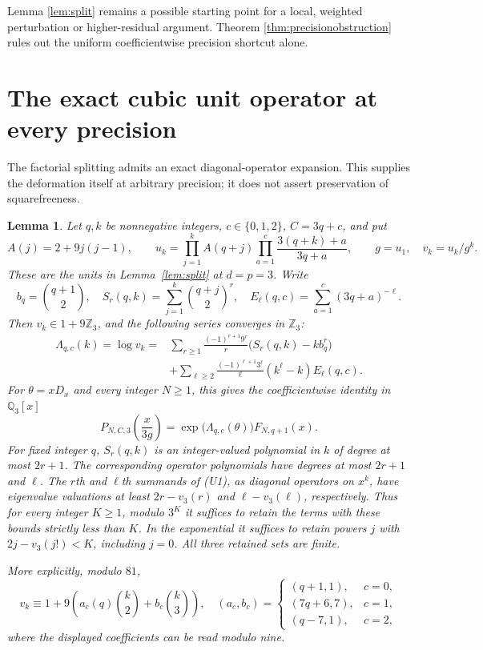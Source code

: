 \documentclass[11pt]{article}
\newtheorem{lemma}[theorem]{Lemma}
\begin{document}
Lemma \ref{lem:split} remains a possible starting point for a local,
weighted perturbation or higher-residual argument.
Theorem \ref{thm:precisionobstruction} rules out the uniform
coefficientwise precision shortcut alone.

\section{The exact cubic unit operator at every precision}
The factorial splitting admits an exact diagonal-operator expansion.
This supplies the deformation itself at arbitrary precision; it does
not assert preservation of squarefreeness.

\begin{lemma}\label{lem:cubic-unit-operator}
Let $q,k$ be nonnegative integers, $c\in\{0,1,2\}$, $C=3q+c$, and put
\[
 A(j)=2+9j(j-1),\qquad
 u_k=\prod_{j=1}^k A(q+j)
       \prod_{a=1}^c\frac{3(q+k)+a}{3q+a},\qquad
 g=u_1,\quad v_k=u_k/g^k .
\]
These are the units in Lemma~\ref{lem:split} at $d=p=3$.
Write
\[
 b_q=\binom{q+1}{2},\quad
 S_r(q,k)=\sum_{j=1}^k\binom{q+j}{2}^r,\quad
 E_\ell(q,c)=\sum_{a=1}^c(3q+a)^{-\ell}.
\]
Then $v_k\in1+9\mathbb Z_3$, and the following series converges in
$\mathbb Z_3$:
\[
\begin{split}
 \Lambda_{q,c}(k)=\log v_k={}&
 \sum_{r\ge1}\frac{(-1)^{r+1}9^r}{r}
           \bigl(S_r(q,k)-kb_q^r\bigr)\\
 &+\sum_{\ell\ge2}\frac{(-1)^{\ell+1}3^\ell}{\ell}
           (k^\ell-k)E_\ell(q,c).
\end{split}                                                   \tag{U1}
\]
For $\theta=xD_x$ and every integer $N\ge1$, this gives the coefficientwise
identity in $\mathbb Q_3[x]$
\[
 P_{N,C,3}\!\left(\frac{x}{3g}\right)
       =\exp\!\bigl(\Lambda_{q,c}(\theta)\bigr)F_{N,q+1}(x).
                                                               \tag{U2}
\]
For fixed integer $q$, $S_r(q,k)$ is an integer-valued polynomial
in $k$ of degree at most $2r+1$. The corresponding operator
polynomials have degrees at most $2r+1$ and $\ell$. The $r$th and $\ell$th summands of
(U1), as diagonal operators on $x^k$, have eigenvalue valuations
at least $2r-v_3(r)$ and $\ell-v_3(\ell)$, respectively.
Thus for every integer $K\ge1$, modulo $3^K$ it suffices to
retain the terms with these bounds
strictly less than $K$. In the exponential it suffices to retain
powers $j$ with $2j-v_3(j!)<K$, including $j=0$.
All three retained sets are finite.

More explicitly, modulo $81$,
\[
 v_k\equiv1+9\left(a_c(q)\binom k2+b_c\binom k3\right),
 \quad
 (a_c,b_c)=
 \begin{cases}
 (q+1,1),&c=0,\\
 (7q+6,7),&c=1,\\
 (q-7,1),&c=2,
 \end{cases}                                                \tag{U3}
\]
where the displayed coefficients can be read modulo nine.
\end{lemma}
\end{document}
